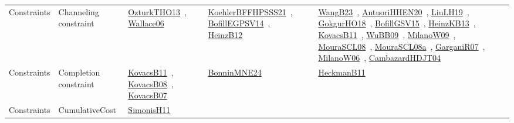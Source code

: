 {\begin{longtable}{lp{3cm}>{\raggedright\arraybackslash}p{6cm}>{\raggedright\arraybackslash}p{6cm}>{\raggedright\arraybackslash}p{8cm}}
Constraints & Channeling constraint & \href{../works/OzturkTHO13.pdf}{OzturkTHO13}~\cite{OzturkTHO13}, \href{../works/Wallace06.pdf}{Wallace06}~\cite{Wallace06} & \href{../works/KoehlerBFFHPSSS21.pdf}{KoehlerBFFHPSSS21}~\cite{KoehlerBFFHPSSS21}, \href{../works/BofillEGPSV14.pdf}{BofillEGPSV14}~\cite{BofillEGPSV14}, \href{../works/HeinzB12.pdf}{HeinzB12}~\cite{HeinzB12} & \href{../works/WangB23.pdf}{WangB23}~\cite{WangB23}, \href{../works/AntuoriHHEN20.pdf}{AntuoriHHEN20}~\cite{AntuoriHHEN20}, \href{../works/LiuLH19.pdf}{LiuLH19}~\cite{LiuLH19}, \href{../works/GokgurHO18.pdf}{GokgurHO18}~\cite{GokgurHO18}, \href{../works/BofillGSV15.pdf}{BofillGSV15}~\cite{BofillGSV15}, \href{../works/HeinzKB13.pdf}{HeinzKB13}~\cite{HeinzKB13}, \href{../works/KovacsB11.pdf}{KovacsB11}~\cite{KovacsB11}, \href{../works/WuBB09.pdf}{WuBB09}~\cite{WuBB09}, \href{../works/MilanoW09.pdf}{MilanoW09}~\cite{MilanoW09}, \href{../works/MouraSCL08.pdf}{MouraSCL08}~\cite{MouraSCL08}, \href{../works/MouraSCL08a.pdf}{MouraSCL08a}~\cite{MouraSCL08a}, \href{../works/GarganiR07.pdf}{GarganiR07}~\cite{GarganiR07}, \href{../works/MilanoW06.pdf}{MilanoW06}~\cite{MilanoW06}, \href{../works/CambazardHDJT04.pdf}{CambazardHDJT04}~\cite{CambazardHDJT04}\\
Constraints & Completion constraint & \href{../works/KovacsB11.pdf}{KovacsB11}~\cite{KovacsB11}, \href{../works/KovacsB08.pdf}{KovacsB08}~\cite{KovacsB08}, \href{../works/KovacsB07.pdf}{KovacsB07}~\cite{KovacsB07} & \href{../works/BonninMNE24.pdf}{BonninMNE24}~\cite{BonninMNE24} & \href{../works/HeckmanB11.pdf}{HeckmanB11}~\cite{HeckmanB11}\\
Constraints & CumulativeCost & \href{../works/SimonisH11.pdf}{SimonisH11}~\cite{SimonisH11} &  & \\

\end{longtable}}
